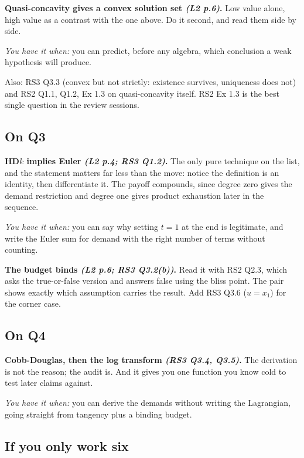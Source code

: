 \documentclass[11pt]{article}
\theoremstyle{definition}
\newcommand{\src}[1]{\textit{\small (#1)}}
\begin{document}
\vspace{4pt}
\noindent\textbf{Quasi-concavity gives a convex solution set \src{L2 p.6}.} Low value alone,
high value as a contrast with the one above. Do it second, and read them side by side.

\emph{You have it when:} you can predict, before any algebra, which conclusion a weak
hypothesis will produce.

\vspace{4pt}
\noindent Also: RS3 Q3.3 (convex but not strictly: existence survives, uniqueness does not)
and RS2 Q1.1, Q1.2, Ex 1.3 on quasi-concavity itself. RS2 Ex 1.3 is the best single question
in the review sessions.

\subsection{On Q3}

\textbf{HD$k$ implies Euler \src{L2 p.4; RS3 Q1.2}.} The only pure technique on the list,
and the statement matters far less than the move: notice the definition is an identity, then
differentiate it. The payoff compounds, since degree zero gives the demand restriction and
degree one gives product exhaustion later in the sequence.

\emph{You have it when:} you can say why setting $t=1$ at the end is legitimate, and write
the Euler sum for demand with the right number of terms without counting.

\vspace{4pt}
\noindent\textbf{The budget binds \src{L2 p.6; RS3 Q3.2(b)}.} Read it with RS2 Q2.3, which
asks the true-or-false version and answers false using the bliss point. The pair shows
exactly which assumption carries the result. Add RS3 Q3.6 ($u=x_1$) for the corner case.

\subsection{On Q4}

\textbf{Cobb-Douglas, then the log transform \src{RS3 Q3.4, Q3.5}.} The derivation is not
the reason; the audit is. And it gives you one function you know cold to test later claims
against.

\emph{You have it when:} you can derive the demands without writing the Lagrangian, going
straight from tangency plus a binding budget.

\subsection{If you only work six}
\end{document}

